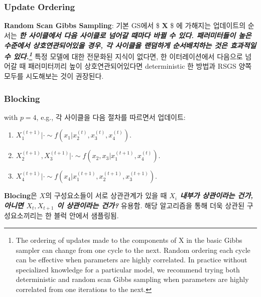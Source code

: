 \documentclass[
]{book}
\providecommand{\tightlist}{%
  \setlength{\itemsep}{0pt}\setlength{\parskip}{0pt}}
\begin{document}
~\\
~\\

\hypertarget{update-ordering}{%
\subsubsection{Update Ordering}\label{update-ordering}}

\textbf{Random Scan Gibbs Sampling}: 기본 GS에서 \$ \textbf X \$ 에 가해지는 업데이트의 순서는 \textbf{\emph{한 사이클에서 다음 사이클로 넘어갈 때마다 바뀔 수 있다. 패러미터들이 높은 수준에서 상호연관되어있을 경우, 각 사이클을 랜덤하게 순서배치하는 것은 효과적일 수 있다.\footnote{The ordering of updates made to the components of X in the basic Gibbs sampler can change from one cycle to the next. Random ordering each cycle can be effective when parameters are highly correlated. In practice without specialized knowledge for a particular model, we recommend trying both deterministic and random scan Gibbs sampling when parameters are highly correlated from one iterations to the next.}}} 특정 모델에 대한 전문화된 지식이 없다면, 한 이터레이션에서 다음으로 넘어갈 때 패러미터끼리 높이 상호연관되어있다면 deterministic 한 방법과 RSGS 양쪽 모두를 시도해보는 것이 권장된다.

\hypertarget{blocking}{%
\subsubsection{Blocking}\label{blocking}}

with \(p=4\), e.g., 각 사이클을 다음 절차를 따르면서 업데이트:

\begin{enumerate}
\def\labelenumi{\arabic{enumi}.}
\tightlist
\item
  \(X_1^{(t+1)}\rvert \cdot \sim f \left(x_1 \rvert x_2^{(t)}, x_3^{(t)}, x_4^{(t)} \right)\).
\item
  \(X_2^{(t+1)}, X_3^{(t+1)}\rvert \cdot \sim f \left(x_2, x_3 \rvert x_1^{(t+1)}, x_4^{(t)} \right)\).
\item
  \(X_4^{(t+1)}\rvert \cdot \sim f \left(x_4 \rvert x_1^{(t+1)}, x_2^{(t+1)}, x_3^{(t+1)} \right)\).
\end{enumerate}

\textbf{Blocing}은 \(X\)의 구성요소들이 서로 상관관계가 있을 때 \textbf{\emph{\(X_i\) 내부가 상관이라는 건가, 아니면 \(X_t, X_{t+1}\) 이 상관이라는 건가?}} 유용함. 해당 알고리즘을 통해 더욱 상관된 구성요소끼리는 한 블럭 안에서 샘플링됨.
\end{document}

